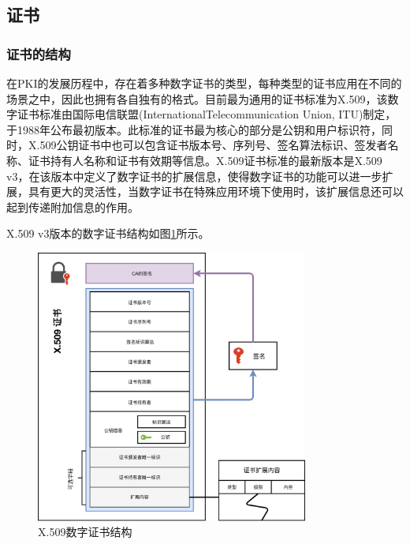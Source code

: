 \subsection{证书}

\subsubsection{证书的结构}


在PKI的发展历程中，存在着多种数字证书的类型，每种类型的证书应用在不同的场景之中，因此也拥有各自独有的格式。目前最为通用的证书标准为X.509，该数字证书标准由国际电信联盟(InternationalTelecommunication Union, ITU)制定，于1988年公布最初版本。此标准的证书最为核心的部分是公钥和用户标识符，同时，X.509公钥证书中也可以包含证书版本号、序列号、签名算法标识、签发者名称、证书持有人名称和证书有效期等信息。X.509证书标准的最新版本是X.509 v3，在该版本中定义了数字证书的扩展信息，使得数字证书的功能可以进一步扩展，具有更大的灵活性，当数字证书在特殊应用环境下使用时，该扩展信息还可以起到传递附加信息的作用。

X.509 v3版本的数字证书结构如图\ref{fig:certificate}所示。

\begin{figure}[htbp]
 	\centering
 	\includegraphics[width = 0.8\textwidth]{img/certificate}
 	\caption{X.509数字证书结构\cite{fredriksson2017distributed}}\label{fig:certificate}
\end{figure}


